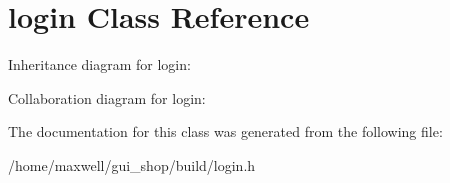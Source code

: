 \hypertarget{classlogin}{}\section{login Class Reference}
\label{classlogin}


Inheritance diagram for login\+:


Collaboration diagram for login\+:


The documentation for this class was generated from the following file\+:\begin{DoxyCompactItemize}
\item 
/home/maxwell/gui\+\_\+shop/build/login.\+h\end{DoxyCompactItemize}
